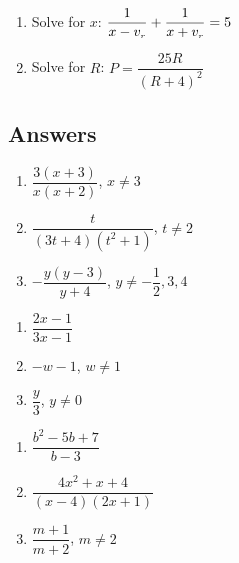 \begin{multicols}{2}
\begin{enumerate}
\setcounter{enumi}{\value{HW}}


\item  Solve for $x$:  $\dfrac{1}{x - v_{\text{\tiny $r$}}} + \dfrac{1}{x + v_{\text{\tiny $r$}}} = 5$

\item Solve for $R$:  $P = \dfrac{25R}{(R+4)^2}$ \label{litrateqnlast}

\setcounter{HW}{\value{enumi}}
\end{enumerate}
\end{multicols}

\newpage

\subsection{Answers}

\begin{multicols}{3}
\begin{enumerate}

\item $\dfrac{3(x+3)}{x(x+2)}$, $x \neq 3$
\item $\dfrac{t}{(3t+4)(t^2+1)}$, $t \neq 2$
\item $-\dfrac{y(y-3)}{y+4}$, $y \neq -\dfrac{1}{2}, 3, 4$ 

\setcounter{HW}{\value{enumi}}
\end{enumerate}
\end{multicols}

\begin{multicols}{3}
\begin{enumerate}
\setcounter{enumi}{\value{HW}}

\item  $\dfrac{2x-1}{3x-1}$
\item  $-w-1$, $w \neq 1$
\item  $\dfrac{y}{3}$, $y \neq 0$
 

\setcounter{HW}{\value{enumi}}
\end{enumerate}
\end{multicols}

\begin{multicols}{3}
\begin{enumerate}
\setcounter{enumi}{\value{HW}}

\item  $\dfrac{b^2-5b+7}{b-3}$
\item  $\dfrac{4x^2+x+4}{(x-4)(2x+1)}$
\item  $\dfrac{m+1}{m+2}$, $m \neq 2$

\setcounter{HW}{\value{enumi}}
\end{enumerate}
\end{multicols}


